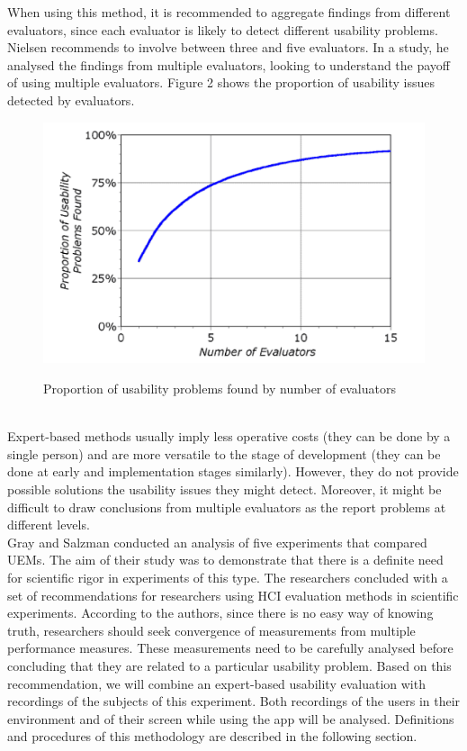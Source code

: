 When using this method, it is recommended to aggregate findings from different evaluators, since each evaluator is likely to detect different usability problems. Nielsen \cite{Nielsen1994-un} recommends to involve between three and five evaluators. In a study, he analysed the findings from multiple evaluators, looking to understand the payoff of using multiple evaluators. Figure 2 shows the proportion of usability issues detected by evaluators.
\begin{figure}[!h]
    \includegraphics[clip,width=\columnwidth]{Figures/evaluators.png}%
\caption{Proportion of usability problems found by number of evaluators}
\label{fig:timeseries}
\cite{Nielsen_undated-po}
\end{figure}\\
Expert-based methods usually imply less operative costs (they can be done by a single person) and are more versatile to the stage of development (they can be done at early and implementation stages similarly).  However, they do not provide possible solutions the usability issues they might  detect. Moreover, it might be difficult to draw conclusions from multiple evaluators as the report problems at different levels.\\
Gray and Salzman \cite{Gray1998-oo} conducted an analysis of five experiments that compared UEMs. The aim of their study was to demonstrate that there is a definite need for scientific rigor in experiments of this type. The researchers concluded with a set of recommendations for researchers using HCI evaluation methods in scientific experiments. According to the authors, since there is no easy way of knowing truth, researchers should seek convergence of measurements from multiple performance measures. These measurements need to be carefully analysed before concluding that they are related to a particular usability problem. Based on this recommendation, we will combine an expert-based usability evaluation with recordings of the subjects of this experiment. Both recordings of the users in their environment and of their screen while using the app will be analysed. Definitions and procedures of this methodology are described in the following section.
